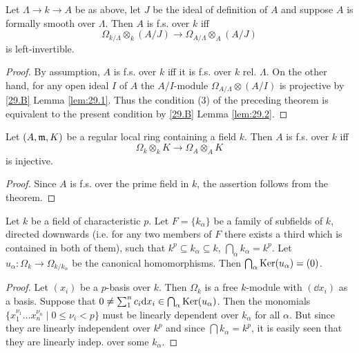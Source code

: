 \documentclass[../main]{subfiles}
\begin{document}
\begin{partheorem}
\label{thm:066}
Let $\Lambda \longrightarrow k \longrightarrow A$ be as above, let $J$ be the ideal of definition of $A$ and suppose $A$ is formally smooth over $\Lambda$. Then $A$ is f.s. over $k$ iff
\[
\Omega_{k/\Lambda} \otimes_k (A/J) \longrightarrow \Omega_{A/\Lambda} \otimes_A (A/J)
\]
is left-invertible. 
\end{partheorem}

\begin{proof}
By assumption, $A$ is f.s. over $k$ iff it is f.s. over $k$ rel. $\Lambda$. On the other hand, for any open ideal $I$ of $A$ the $A/I$-module $\Omega_{A/\Lambda} \otimes (A/I)$ is projective by \ref{29.B} Lemma \ref{lem:29.1}. Thus the condition (3) of the preceding theorem is equivalent to the present condition by \ref{29.B} Lemma \ref{lem:29.2}. 
\end{proof}

\begin{corollary}
Let $(A, \mathfrak{m}, K)$ be a regular local ring containing a field $k$. Then $A$ is f.s. over $k$ iff
\[
\Omega_k \otimes_k K \longrightarrow \Omega_A \otimes_A K
\]
is injective.
\end{corollary}

\begin{proof}
Since $A$ is f.s. over the prime field in $k$, the assertion follows from the theorem.
\end{proof}

\begin{parlemma}\label{lem:30.01}
Let $k$ be a field of characteristic $p$. Let $F = \{k_\alpha\}$ be a family of subfields of $k$, directed downwards (i.e. for any two members of $F$ there exists a third which is contained in both of them), such that $k^p \subseteq k_\alpha \subseteq k$, $\bigcap_\alpha k_\alpha = k^p$. Let $u_\alpha : \Omega_k \longrightarrow \Omega_{k/k_\alpha}$ be the canonical homomorphisms. Then $\bigcap_\alpha \operatorname{Ker}(u_\alpha) = (0)$.
\end{parlemma}

\begin{proof}
Let $(x_i)$ be a $p$-basis over $k$. Then $\Omega_k$ is a free $k$-module with $(\dd x_i)$ as a basis. Suppose that $0 \ne \sum_1^n c_i \mathrm{d}x_i \in \bigcap_\alpha \operatorname{Ker}(u_\alpha)$. Then the monomials $\{x_1^{\nu_1} \ldots x_n^{\nu_n} \mid 0 \le \nu_i < p\}$ must be linearly dependent over $k_\alpha$ for all $\alpha$. But since they are linearly independent over $k^p$ and since $\bigcap k_\alpha = k^p$, it is easily seen that they are linearly indep. over some $k_\alpha$. 
\end{proof}
\end{document}
